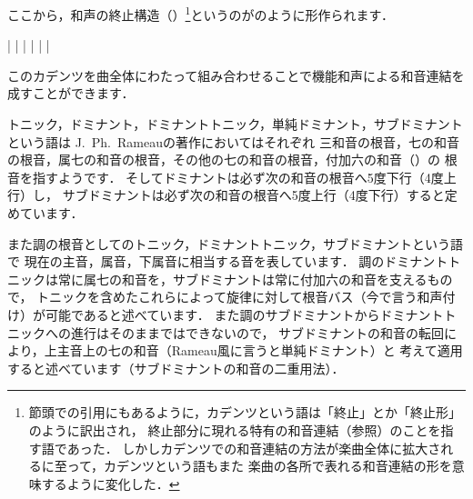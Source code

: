 \documentclass[dvipdfmx,uplatex,b5paper,openany,jbase=12Q,nomag*,textwidth-limit=44%
               ]{gachimuchi}
\begin{document}
ここから，和声の終止構造（）\footnote{%
  節頭での引用にもあるように，カデンツという語は「終止」とか「終止形」のように訳出され，
  終止部分に現れる特有の和音連結（参照）のことを指す語であった．
  しかしカデンツでの和音連結の方法が楽曲全体に拡大されるに至って，カデンツという語もまた
  楽曲の各所で表れる和音連結の形を意味するように変化した．
}というのがのように形作られます．

\begin{Music}
  \Startpiece
  \znotes|\en
  \NOTes%
  |%
  \en\doublebar%
  \znotes|\en
  \NOTes%
  |%
  \en\doublebar%
  \znotes|\en
  \NOTes%
  |%
  \en\setdoublebar%
  \endpiece
\end{Music}

このカデンツを曲全体にわたって組み合わせることで機能和声による和音連結を成すことができます．


\begin{Yodan}
トニック，ドミナント，ドミナントトニック，単純ドミナント，サブドミナントという語は
J.~Ph.~Rameauの著作においてはそれぞれ
三和音の根音，七の和音の根音，属七の和音の根音，その他の七の和音の根音，付加六の和音（）の
根音を指すようです．
そしてドミナントは必ず次の和音の根音へ5度下行（4度上行）し，
サブドミナントは必ず次の和音の根音へ5度上行（4度下行）すると定めています．

また調の根音としてのトニック，ドミナントトニック，サブドミナントという語で
現在の主音，属音，下属音に相当する音を表しています．
調のドミナントトニックは常に属七の和音を，サブドミナントは常に付加六の和音を支えるもので，
トニックを含めたこれらによって旋律に対して根音バス（今で言う和声付け）が可能であると述べています．
また調のサブドミナントからドミナントトニックへの進行はそのままではできないので，
サブドミナントの和音の転回により，上主音上の七の和音（Rameau風に言うと単純ドミナント）と
考えて適用すると述べています（サブドミナントの和音の二重用法）．
\end{Yodan}
\end{document}
